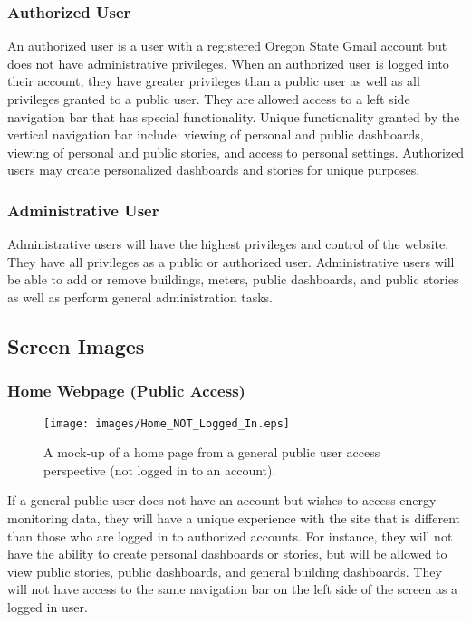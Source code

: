 \documentclass[journal,10pt,onecolumn,compsoc]{IEEEtran}
\begin{document}
	\subsubsection{Authorized User}
	An authorized user is a user with a registered Oregon State Gmail account but does not have administrative privileges. When an authorized user is logged into their account, 
	they have greater privileges than a public user as well as all privileges granted to a public user. They are allowed access to a left side navigation 
	bar that has special functionality. Unique functionality granted by the vertical navigation bar include: viewing of personal and public dashboards, viewing of personal and public
	stories, and access to personal settings. Authorized users may create personalized dashboards and stories for unique purposes.
	
	\subsubsection{Administrative User}
	Administrative users will have the highest privileges and control of the website. They have all privileges as a public or authorized user. Administrative users
	will be able to add or remove buildings, meters, public dashboards, and public stories as well as perform general administration tasks.
	
	
    \subsection{Screen Images}
    \iffalse
    Display screenshots showing the interface from the user’s perspective. These can be
    hand drawn or you can use an automated drawing tool. Just make them as accurate
    as possible. (Graph paper works well.) 
    \fi 
	
	\subsubsection{Home Webpage (Public Access)}
    \begin{figure}[H]
        \centering
        \texttt{[image: images/Home\_NOT\_Logged\_In.eps]}
        \caption{A mock-up of a home page from a general public user access perspective (not logged in to an account).}
    \end{figure}
	If a general public user does not have an account but wishes to access energy monitoring data, they will
	have a unique experience with the site that is different than those who are logged in to authorized accounts. 
	For instance, they will not have the ability to create personal dashboards or stories, but will be allowed to view
	public stories, public dashboards, and general building dashboards. They will not have access to the same navigation 
	bar on the left side of the screen as a logged in user. 
	
\end{document}
